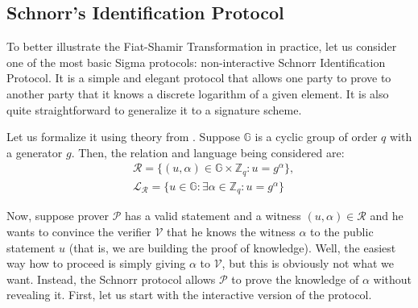 \documentclass[../lecture-notes-105x135.tex]{subfiles}
\begin{document}
\subsection{Schnorr's Identification Protocol}

To better illustrate the Fiat-Shamir Transformation in practice, let us consider one of the most basic Sigma protocols: non-interactive Schnorr Identification Protocol. It is a simple and elegant protocol that allows one party to prove to another party that it knows a discrete logarithm of a given element. It is also quite straightforward to generalize it to a signature scheme.

Let us formalize it using theory from . Suppose $\mathbb{G}$ is a cyclic group of order $q$ with a generator $g$. Then, the relation and language being considered are:
\begin{equation*}
    \begin{aligned}
        &\mathcal{R} = \{(u, \alpha) \in \mathbb{G} \times \mathbb{Z}_q: u = g^{\alpha}\}, \\
        &\mathcal{L}_{\mathcal{R}} = \{u \in \mathbb{G}: \exists \alpha \in \mathbb{Z}_q: u = g^{\alpha}\}        
    \end{aligned}
\end{equation*}

\vspace{-1mm}

Now, suppose prover $\mathcal{P}$ has a valid statement and a witness $(u,\alpha) \in \mathcal{R}$ and he wants to convince the verifier $\mathcal{V}$ that he knows the witness $\alpha$ to the public statement $u$ (that is, we are building the proof of knowledge). Well, the easiest way how to proceed is simply giving $\alpha$ to $\mathcal{V}$, but this is obviously not what we want. Instead, the Schnorr protocol allows $\mathcal{P}$ to prove the knowledge of $\alpha$ without revealing it. 
First, let us start with the interactive version of the protocol. 

\vspace{-2mm}
\end{document}
